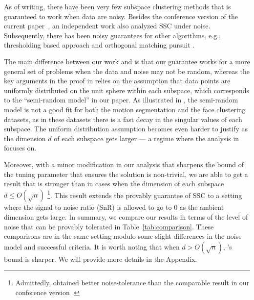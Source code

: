 \documentclass[main]{subfiles}
\begin{document}
As of writing, there have been very few subspace clustering methods that is guaranteed to work when data are noisy.  Besides the conference version of the current paper~\cite{wang2013noisy}, an independent work \cite{soltanolkotabi2013robust} also analyzed SSC under noise. Subsequently, there has been noisy guarantees for other algorithms, e.g., thresholding based approach \cite{heckel2013noisy} and
orthogonal matching pursuit \cite{dyer2013greedy}.

The main difference between our work and \cite{soltanolkotabi2013robust} is that our guarantee works for a more general set of problems when the data and noise may not be random, whereas the key arguments in the proof in \cite{soltanolkotabi2013robust} relies on the assumption that data points are uniformly distributed on the unit sphere within each subspace, which corresponds to the ``semi-random model'' in our paper.
As illustrated in \cite[Figure~9~and~10]{elhamifar2012ssc_journal}, the semi-random model is not a good fit for both the motion segmentation and the face clustering datasets, as in these datasets there is a fast decay in the singular values of each subspace.  The uniform distribution assumption becomes even harder to justify as the dimension $d$ of each subspace gets larger --- a regime where the analysis in \cite{soltanolkotabi2013robust} focuses on.

Moreover, with a minor modification in our analysis that sharpens the bound of the tuning parameter that ensures the solution is non-trivial, we are able to get a result that is stronger than \cite{soltanolkotabi2013robust} in cases when the dimension of each subspace $d\leq O(\sqrt{n})$ \footnote{Admittedly, \cite{soltanolkotabi2013robust} obtained better noise-tolerance than the comparable result in our conference version \cite{wang2013noisy}. }. This result extends the provably guarantee of SSC to a setting where the signal to noise ratio (SnR) is allowed to go to $0$ as the ambient dimension gets large. In summary, we compare our results in terms of the level of noise that can be provably tolerated in Table~\ref{tab:comparison}. These comparisons are in the same setting modulo some slight differences in the noise model and successful criteria. It is worth noting that when $d>O(\sqrt{n})$, \cite{soltanolkotabi2013robust}'s bound is sharper. We will provide more details in the Appendix.


\end{document}
